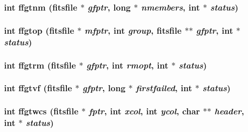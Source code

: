 \subsubsection{\setlength{\rightskip}{0pt plus 5cm}int ffgtnm (\bf{fitsfile} $\ast$ {\em gfptr}, long $\ast$ {\em nmembers}, int $\ast$ {\em status})}\label{test_2shm__client_2fitsio_8h_b80f93976748e97b100bb159c245ed96}


\subsubsection{\setlength{\rightskip}{0pt plus 5cm}int ffgtop (\bf{fitsfile} $\ast$ {\em mfptr}, int {\em group}, \bf{fitsfile} $\ast$$\ast$ {\em gfptr}, int $\ast$ {\em status})}\label{test_2shm__client_2fitsio_8h_57ba25ba0c05bbdf61f15e21900264ec}


\subsubsection{\setlength{\rightskip}{0pt plus 5cm}int ffgtrm (\bf{fitsfile} $\ast$ {\em gfptr}, int {\em rmopt}, int $\ast$ {\em status})}\label{test_2shm__client_2fitsio_8h_8eb856e08aa6132af39ea5367b9f3d84}


\subsubsection{\setlength{\rightskip}{0pt plus 5cm}int ffgtvf (\bf{fitsfile} $\ast$ {\em gfptr}, long $\ast$ {\em firstfailed}, int $\ast$ {\em status})}\label{test_2shm__client_2fitsio_8h_62614e8f30dfc3b69da9082d255df146}


\subsubsection{\setlength{\rightskip}{0pt plus 5cm}int ffgtwcs (\bf{fitsfile} $\ast$ {\em fptr}, int {\em xcol}, int {\em ycol}, char $\ast$$\ast$ {\em header}, int $\ast$ {\em status})}\label{test_2shm__client_2fitsio_8h_8aebd57fb3bdfea239f253d351428280}


